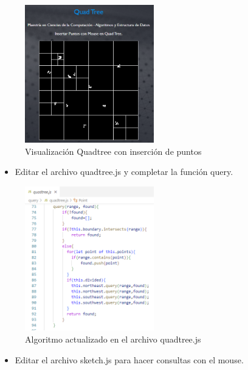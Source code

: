\documentclass{article}
\begin{document}
\begin{enumerate}
\begin{figure}[H]
\centering
\includegraphics[width=0.5\textwidth]{Img/insertar puntos_quadtree.png}
\caption{Visualización Quadtree con inserción de puntos}
\end{figure}

\begin{itemize}
   \item Editar el archivo quadtree.js y completar la función query.
\end{itemize}

\begin{figure}[H]
\centering
\includegraphics[width=0.5\textwidth]{Img/quadtree_query.png}
\caption{Algoritmo actualizado en el archivo quadtree.js}
\end{figure}

\begin{itemize}
   \item Editar el archivo sketch.js para hacer consultas con el mouse.
\end{itemize}


\end{enumerate}
\end{document}
